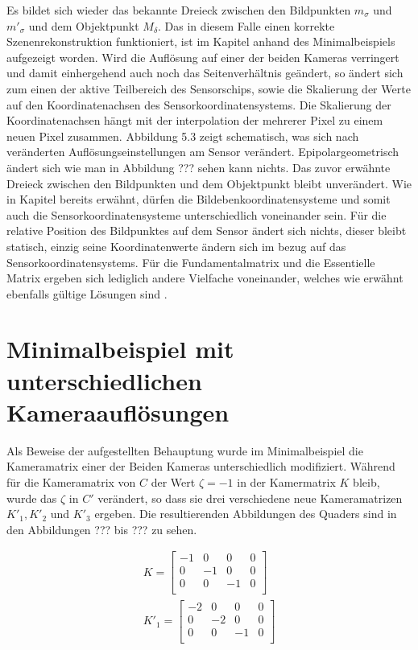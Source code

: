 Es bildet sich wieder das bekannte Dreieck zwischen den Bildpunkten $m_\sigma$ und $m'_{\sigma}$ und dem Objektpunkt $M_\delta$. Das in diesem Falle einen korrekte Szenenrekonstruktion funktioniert, ist im Kapitel  anhand des Minimalbeispiels aufgezeigt worden. Wird die Auflösung auf einer der beiden Kameras verringert und damit einhergehend auch noch das Seitenverhältnis geändert, so ändert sich zum einen der aktive Teilbereich des Sensorschips, sowie die Skalierung der Werte auf den Koordinatenachsen des Sensorkoordinatensystems. Die Skalierung der Koordinatenachsen hängt mit der interpolation der mehrerer Pixel zu einem neuen Pixel zusammen. Abbildung 5.3 zeigt schematisch, was sich nach veränderten Auflösungseinstellungen am Sensor verändert.%
Epipolargeometrisch ändert sich wie man in Abbildung ??? sehen kann nichts. Das zuvor erwähnte Dreieck zwischen den Bildpunkten und dem Objektpunkt bleibt unverändert. Wie in Kapitel  bereits erwähnt, dürfen die Bildebenkoordinatensysteme und somit auch die Sensorkoordinatensysteme unterschiedlich voneinander sein\cite{Elements}. Für die relative Position des Bildpunktes auf dem Sensor ändert sich nichts, dieser bleibt statisch, einzig seine Koordinatenwerte ändern sich im bezug auf das Sensorkoordinatensystems. Für die Fundamentalmatrix und die Essentielle Matrix ergeben sich lediglich andere Vielfache voneinander, welches wie erwähnt ebenfalls gültige Lösungen sind \cite{HZ,Ferid}.

\section{Minimalbeispiel mit unterschiedlichen Kameraauflösungen}

Als Beweise der aufgestellten Behauptung wurde im Minimalbeispiel die Kameramatrix einer der Beiden Kameras unterschiedlich modifiziert. Während für die Kameramatrix von $C$ der Wert $\zeta = -1$ in der Kamermatrix $K$ bleib, wurde das $\zeta$ in $C'$ verändert, so dass sie drei verschiedene neue Kameramatrizen $K'_1, K'_2$ und $K'_3$ ergeben. Die resultierenden Abbildungen des Quaders sind in den Abbildungen ??? bis ??? zu sehen.



\begin{gather}
K = \begin{bmatrix}
-1&0&0&0\\
0&-1&0&0\\
0&0&-1&0\\
\end{bmatrix}\\
K'_1 = \begin{bmatrix}
-2&0&0&0\\
0&-2&0&0\\
0&0&-1&0\\
\end{bmatrix}\\
\end{gather}

